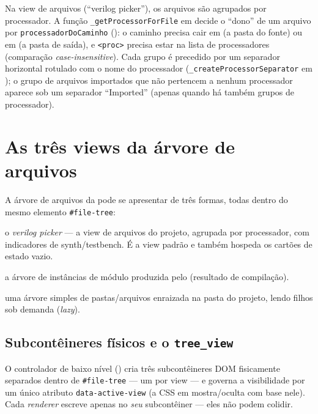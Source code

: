 Na view de arquivos (\enquote{verilog picker}), os arquivos são agrupados por
processador. A função \lstinline|_getProcessorForFile| em 
decide o \enquote{dono} de um arquivo por \lstinline|processadorDoCaminho|
(): o caminho precisa cair em
 (a pasta do fonte) ou em
 (a pasta de saída), e
\lstinline|<proc>| precisa estar na lista de processadores (comparação
\emph{case-insensitive}). Cada grupo é precedido por um separador
horizontal rotulado com o nome do processador
(\lstinline|_createProcessorSeparator| em ); o
grupo de arquivos importados que não pertencem a nenhum processador aparece sob
um separador \enquote{Imported} (apenas quando há também grupos de processador).

\section{As três views da árvore de arquivos}
\label{sec:views}

A árvore de arquivos da  pode se apresentar de três formas, todas
dentro do mesmo elemento \lstinline|#file-tree|:

\begin{description}[leftmargin=2em,style=nextline]
  \item[\enquote{verilog}] o \emph{verilog picker} — a view de arquivos do
    projeto, agrupada por processador, com indicadores de synth/testbench. É a
    view padrão e também hospeda os cartões de estado vazio.
  \item[\enquote{hierarchy}] a árvore de instâncias de módulo produzida pelo
     (resultado de compilação).
  \item[\enquote{standard}] uma árvore simples de pastas/arquivos enraizada na
    pasta do projeto, lendo filhos sob demanda (\emph{lazy}).
\end{description}

\subsection{Subcontêineres físicos e o \texttt{tree\_view}}

O controlador de baixo nível  ()
cria três subcontêineres DOM fisicamente separados dentro de
\lstinline|#file-tree| — um por view — e governa a visibilidade por um único
atributo \lstinline|data-active-view| (a CSS em 
mostra/oculta com base nele). Cada \emph{renderer} escreve apenas no \emph{seu}
subcontêiner — eles não podem colidir.

